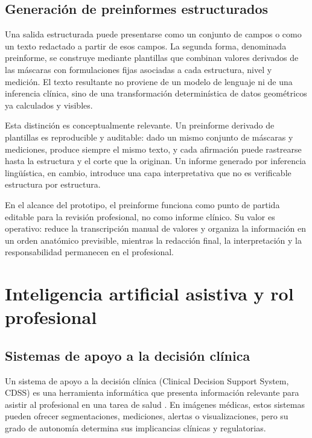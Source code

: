 \subsection{Generación de preinformes estructurados}

Una salida estructurada puede presentarse como un conjunto de campos o como un texto redactado a partir de esos campos. La segunda forma, denominada preinforme, se construye mediante plantillas que combinan valores derivados de las máscaras con formulaciones fijas asociadas a cada estructura, nivel y medición. El texto resultante no proviene de un modelo de lenguaje ni de una inferencia clínica, sino de una transformación determinística de datos geométricos ya calculados y visibles.

Esta distinción es conceptualmente relevante. Un preinforme derivado de plantillas es reproducible y auditable: dado un mismo conjunto de máscaras y mediciones, produce siempre el mismo texto, y cada afirmación puede rastrearse hasta la estructura y el corte que la originan. Un informe generado por inferencia lingüística, en cambio, introduce una capa interpretativa que no es verificable estructura por estructura.

En el alcance del prototipo, el preinforme funciona como punto de partida editable para la revisión profesional, no como informe clínico. Su valor es operativo: reduce la transcripción manual de valores y organiza la información en un orden anatómico previsible, mientras la redacción final, la interpretación y la responsabilidad permanecen en el profesional.

\section{Inteligencia artificial asistiva y rol profesional}

\subsection{Sistemas de apoyo a la decisión clínica}

Un sistema de apoyo a la decisión clínica (Clinical Decision Support System, CDSS) es una herramienta informática que presenta información relevante para asistir al profesional en una tarea de salud \parencite{berner_cdss_2007}. En imágenes médicas, estos sistemas pueden ofrecer segmentaciones, mediciones, alertas o visualizaciones, pero su grado de autonomía determina sus implicancias clínicas y regulatorias.

